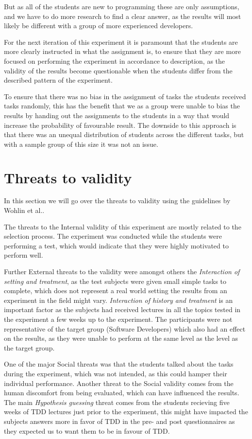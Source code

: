 \documentclass{sig-alternate-05-2015}
\begin{document}
But as all of the students are new to programming these are only assumptions, and we have to do more research to find a clear answer, as the results will most likely be different with a group of more experienced developers.

For the next iteration of this experiment it is paramount that the students are more clearly instructed in what the assignment is, to ensure that they are more focused on performing the experiment in accordance to description, as the validity of the results become questionable when the students differ from the described pattern of the experiment. 

To ensure that there was no bias in the assignment of tasks the students received tasks randomly, this has the benefit that we as a group were unable to bias the results by handing out the assignments to the students in a way that would increase the probability of favourable result. The downside to this approach is that there was an unequal distribution of students across the different tasks, but with a sample group of this size it was not an issue.


\section{Threats to validity}
In this section we will go over the threats to validity using the guidelines by Wohlin et al.\cite{wohlin1}.

The threats to the Internal validity of this experiment are mostly related to the selection process. The experiment was conducted while the students were performing a test, which would indicate that they were highly motivated to perform well.

Further External threats to the validity were amongst others the \textit{Interaction of setting and treatment}, as the test subjects were given small simple tasks to complete, which does not represent a real world setting the results from an experiment in the field might vary. \textit{Interaction of history and treatment} is an important factor as the subjects had received lectures in all the topics tested in the experiment a few weeks up to the experiment. The participants were not representative of the target group (Software Developers) which also had an effect on the results, as they were unable to perform at the same level as the level as the target group.

One of the major Social threats was that the students talked about the tasks during the experiment, which was not intended, as this could hamper their individual performance. Another threat to the Social validity comes from the human discomfort from being evaluated, which can have influenced the results. The main \textit{Hypothesis guessing} threat comes from the students recieving five  weeks of TDD lectures just prior to the experiment, this might have impacted the subjects answers more in favor of TDD in the pre- and post questionnaires as they expected us to want them to be in favour of TDD. 
\end{document}
